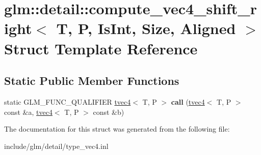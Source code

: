 \hypertarget{structglm_1_1detail_1_1compute__vec4__shift__right}{}\section{glm\+:\+:detail\+:\+:compute\+\_\+vec4\+\_\+shift\+\_\+right$<$ T, P, Is\+Int, Size, Aligned $>$ Struct Template Reference}
\label{structglm_1_1detail_1_1compute__vec4__shift__right}
\subsection*{Static Public Member Functions}
\begin{DoxyCompactItemize}
\item 
\mbox{\label{structglm_1_1detail_1_1compute__vec4__shift__right_aed5ecb34328ffee138cf21983a9a42fb}} 
static G\+L\+M\+\_\+\+F\+U\+N\+C\+\_\+\+Q\+U\+A\+L\+I\+F\+I\+ER \hyperlink{structglm_1_1tvec4}{tvec4}$<$ T, P $>$ {\bfseries call} (\hyperlink{structglm_1_1tvec4}{tvec4}$<$ T, P $>$ const \&a, \hyperlink{structglm_1_1tvec4}{tvec4}$<$ T, P $>$ const \&b)
\end{DoxyCompactItemize}


The documentation for this struct was generated from the following file\+:\begin{DoxyCompactItemize}
\item 
include/glm/detail/type\+\_\+vec4.\+inl\end{DoxyCompactItemize}

